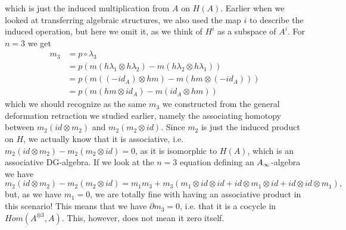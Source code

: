 which is just the induced multiplication from $A$ on $H(A)$. Earlier when we looked at transferring algebraic structures, we also used the map $i$ to describe the induced operation, but here we omit it, as we think of $H^i$ as a subspace of $A^i$. For $n=3$ we get 
\begin{align*}
    m_3 
    &= p\circ \lambda_3 \\
    &= p(m(h\lambda_1\otimes h\lambda_2)-m(h\lambda_2\otimes h\lambda_1)) \\
    &= p(m((-id_A)\otimes hm)-m(hm\otimes (-id_A))) \\
    &= p(m(hm\otimes id_A)-m(id_A\otimes hm))
\end{align*}
which we should recognize as the same $m_3$ we constructed from the general deformation retraction we studied earlier, namely the associating homotopy between $m_2(id\otimes m_2)$ and $m_2(m_2\otimes id)$. Since $m_2$ is just the induced product on $H$, we actually know that it is associative, i.e. $m_2(id\otimes m_2)-m_2(m_2\otimes id)=0$, as it is isomorphic to $H(A)$, which is an associative DG-algebra. If we look at the $n=3$ equation defining an $A_{\infty}$-algebra we have 
\begin{equation*}
    m_2(id\otimes m_2)-m_2(m_2\otimes id) = m_1 m_3 + m_3(m_1\otimes id\otimes id + id\otimes m_1\otimes id + id\otimes id \otimes m_1), 
\end{equation*}
but, as we have $m_1=0$, we are totally fine with having an associative product in this scenario! This means that we have $\partial m_3 = 0$, i.e. that it is a cocycle in $Hom(A^{\otimes 3}, A)$. This, however, does not mean it zero itself.

